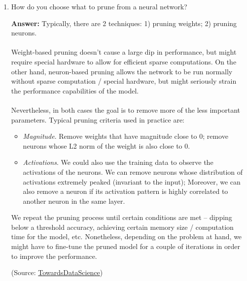 \documentclass{article}
\newenvironment{QandA}{\begin{enumerate}[label=\arabic*.]}{\end{enumerate}}
\newenvironment{InnerQandA}{\begin{enumerate}[label=\roman*.]}{\end{enumerate}}
\newenvironment{answer}{\par\normalfont \textbf{Answer:}}{}
\begin{document}
\begin{QandA}
\begin{InnerQandA}
        \item How do you choose what to prune from a neural network?
        \begin{answer}
            Typically, there are 2 techniques: 1) pruning weights; 2) pruning neurons. \\\\
            Weight-based pruning doesn't cause a large dip in performance, but might require special hardware to allow for efficient sparse computations.  On the other hand, neuron-based pruning allows the network to be run normally without sparse computation / special hardware, but might seriously strain the performance capabilities of the model. \\\\
            Nevertheless, in both cases the goal is to remove more of the less important parameters. Typical pruning criteria used in practice are:
            \begin{itemize}
                \item \textit{Magnitude}. Remove weights that have magnitude close to 0; remove neurons whose L2 norm of the weight is also close to 0.
                \item \textit{Activations}. We could also use the training data to observe the activations of the neurons. We can remove neurons whose distribution of  activations extremely peaked (invariant to the input); Moreover, we can also remove a neuron if its activation pattern is highly correlated to another neuron in the same layer. 
            \end{itemize}

            We repeat the pruning process until certain conditions are met -- dipping below a threshold accuracy, achieving certain memory size / computation time for the model, etc. Nonetheless, depending on the problem at hand, we might have to fine-tune the pruned model for a couple of iterations in order to improve the performance. 
            
            (Source: \href{https://towardsdatascience.com/pruning-neural-networks-1bb3ab5791f9}{TowardsDataScience})
        \end{answer}
    \end{InnerQandA}


\end{QandA}
\end{document}
